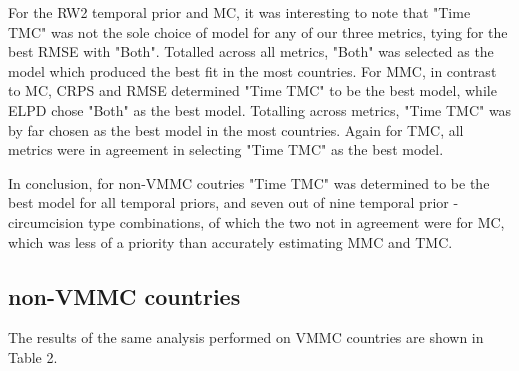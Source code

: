 \documentclass{article}
\begin{document}
For the RW2 temporal prior and MC, it was interesting to note that "Time TMC" was not the sole choice of model for any of  our three metrics, tying for the best RMSE with "Both". 
Totalled across all metrics, "Both" was selected as the model which produced the best fit in the most countries. 
For MMC, in contrast to MC, CRPS and RMSE determined "Time TMC" to be the best  model, while ELPD chose "Both" as the best model. 
Totalling across metrics, "Time TMC" was by far chosen as the best model in the most countries. 
Again for TMC, all metrics were in agreement in selecting "Time TMC" as the best model. 

In conclusion, for non-VMMC coutries "Time TMC" was determined to be the best model for all temporal priors, and seven out of nine temporal prior - circumcision type combinations, of which the two not in agreement were for MC, which was less of a priority than accurately estimating MMC and TMC. 

\subsection{non-VMMC countries}
\label{sec:org09db5e8}

The results of the same analysis performed on VMMC countries are shown in Table 2.

\vspace{10 mm}
\end{document}
